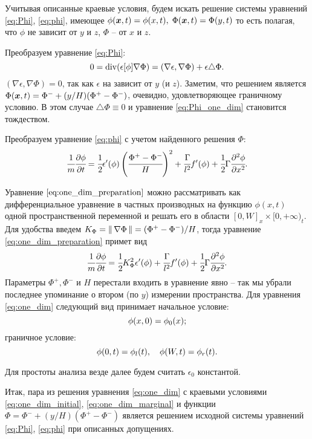 Учитывая описанные краевые условия, будем искать решение системы уравнений \eqref{eq:Phi}, \eqref{eq:phi}, имеющее $\phi({\boldsymbol{x}}, t) = \phi(x, t), \; \Phi({\boldsymbol{x}}, t) = \Phi(y, t)$ то есть полагая, что $\phi$ не зависит от $y$ и $z$, $\Phi$ -- от $x$ и $z$.

Преобразуем уравнение \eqref{eq:Phi}:
\begin{equation}
	0 = \operatorname{{div}}(\epsilon[\phi] \nabla \Phi) = (\nabla \epsilon, \nabla \Phi) + \epsilon \triangle \Phi {\text{.}}
	\label{eq:Phi_one_dim}
\end{equation}
$(\nabla \epsilon, \nabla \Phi) = 0$, так как $\epsilon$ на зависит от $y$ (и $z$). Заметим, что решением является $\Phi({\boldsymbol{x}}, t) = \Phi^- + (y / H)(\Phi^+ - \Phi^-)$, очевидно, удовлетворяющее граничному условию. В этом случае $\triangle \Phi \equiv 0$ и уравнение \eqref{eq:Phi_one_dim} становится тождеством.

Преобразуем уравнение \eqref{eq:phi} с учетом найденного решения $\Phi$:
\begin{equation}
	\cfrac{1}{m} \cfrac{\partial \phi}{\partial t} = \cfrac{1}{2} \epsilon'(\phi) \left( \cfrac{\Phi^+ - \Phi^-}{H} \right)^2 + \cfrac{\Gamma}{l^2} f'(\phi) + \cfrac{1}{2} \Gamma \cfrac{\partial^2 \phi}{\partial x^2} {\text{.}}
	\label{eq:one_dim_preparation}
\end{equation}

Уравнение $\eqref{eq:one_dim_preparation}$ можно рассматривать как дифференциальное уравнение в частных производных на функцию $\phi(x, t)$ одной пространственной переменной и решать его в области $[0, W]_x \times [0, +\infty)_t$. Для удобства введем $K_\Phi = \| \, \nabla \Phi \, \| = (\Phi^+ - \Phi^-) / H$, тогда уравнение \eqref{eq:one_dim_preparation} примет вид
\begin{equation}
	\cfrac{1}{m} \cfrac{\partial \phi}{\partial t} = \cfrac{1}{2} K_\Phi^2 \epsilon'(\phi) + \cfrac{\Gamma}{l^2} f'(\phi) + \cfrac{1}{2} \Gamma \cfrac{\partial^2 \phi}{\partial x^2} {\text{.}}
	\label{eq:one_dim}
\end{equation}
Параметры $\Phi^+, \Phi^-$ и $H$ перестали входить в уравнение явно -- так мы убрали последнее упоминание о втором (по $y$) измерении пространства. Для уравнения \eqref{eq:one_dim} следующий вид принимает начальное условие:
\begin{equation}
	\phi(x, 0) = \phi_0(x) {\text{;}}
	\label{eq:one_dim_initial}
\end{equation}
граничное условие:
\begin{equation}
	\phi(0, t) = \phi_l(t), \quad \phi(W, t) = \phi_r(t) {\text{.}}
	\label{eq:one_dim_marginal}
\end{equation}

Для простоты анализа везде далее будем считать $\epsilon_0$ константой.

Итак, пара из решения уравнения \eqref{eq:one_dim} с краевыми условиями \eqref{eq:one_dim_initial}, \eqref{eq:one_dim_marginal} и функции $\Phi = \Phi^- + (y / H)(\Phi^+ - \Phi^-)$ является решением исходной системы уравнений \eqref{eq:Phi}, \eqref{eq:phi} при описанных допущениях.